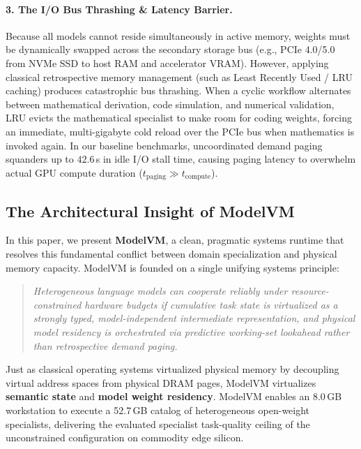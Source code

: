 \paragraph{3. The I/O Bus Thrashing \& Latency Barrier.}
Because all models cannot reside simultaneously in active memory, weights must be dynamically swapped across the secondary storage bus (e.g., PCIe 4.0/5.0 from NVMe SSD to host RAM and accelerator VRAM). However, applying classical retrospective memory management (such as Least Recently Used / LRU caching) produces catastrophic bus thrashing. When a cyclic workflow alternates between mathematical derivation, code simulation, and numerical validation, LRU evicts the mathematical specialist to make room for coding weights, forcing an immediate, multi-gigabyte cold reload over the PCIe bus when mathematics is invoked again. In our baseline benchmarks, uncoordinated demand paging squanders up to $42.6$\,s in idle I/O stall time, causing paging latency to overwhelm actual GPU compute duration ($t_{\text{paging}} \gg t_{\text{compute}}$).

\subsection{The Architectural Insight of ModelVM}
\label{sec:intro_insight}

In this paper, we present \textbf{ModelVM}, a clean, pragmatic systems runtime that resolves this fundamental conflict between domain specialization and physical memory capacity. ModelVM is founded on a single unifying systems principle:

\begin{quote}
\textit{Heterogeneous language models can cooperate reliably under resource-constrained hardware budgets if cumulative task state is virtualized as a strongly typed, model-independent intermediate representation, and physical model residency is orchestrated via predictive working-set lookahead rather than retrospective demand paging.}
\end{quote}

Just as classical operating systems virtualized physical memory by decoupling virtual address spaces from physical DRAM pages, ModelVM virtualizes \textbf{semantic state} and \textbf{model weight residency}. ModelVM enables an 8.0\,GB workstation to execute a 52.7\,GB catalog of heterogeneous open-weight specialists, delivering the evaluated specialist task-quality ceiling of the unconstrained configuration on commodity edge silicon.

